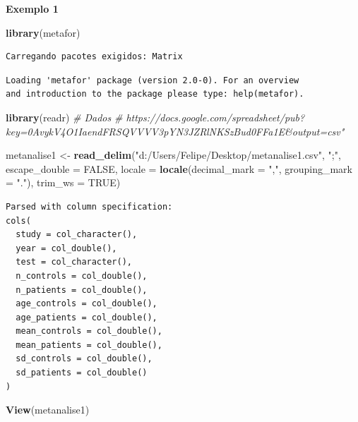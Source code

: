 \documentclass[12pt,brazil,oneside]{book}
\newenvironment{Shaded}{\begin{snugshade}}{\end{snugshade}}
\newcommand{\CommentTok}[1]{\textcolor[rgb]{0.56,0.35,0.01}{\textit{#1}}}
\newcommand{\DataTypeTok}[1]{\textcolor[rgb]{0.13,0.29,0.53}{#1}}
\newcommand{\KeywordTok}[1]{\textcolor[rgb]{0.13,0.29,0.53}{\textbf{#1}}}
\newcommand{\NormalTok}[1]{#1}
\newcommand{\OtherTok}[1]{\textcolor[rgb]{0.56,0.35,0.01}{#1}}
\newcommand{\StringTok}[1]{\textcolor[rgb]{0.31,0.60,0.02}{#1}}
\begin{document}
\textbf{Exemplo 1}

\begin{Shaded}
\begin{Highlighting}[]
\KeywordTok{library}\NormalTok{(metafor)}
\end{Highlighting}
\end{Shaded}

\begin{verbatim}
Carregando pacotes exigidos: Matrix
\end{verbatim}

\begin{verbatim}
Loading 'metafor' package (version 2.0-0). For an overview 
and introduction to the package please type: help(metafor).
\end{verbatim}

\begin{Shaded}
\begin{Highlighting}[]
\KeywordTok{library}\NormalTok{(readr)}
\CommentTok{# Dados}
\CommentTok{# https://docs.google.com/spreadsheet/pub?key=0AvykV4O1IaendFRSQVVVV3pYN3JZRlNKSzBud0FFa1E&output=csv"}

\NormalTok{metanalise1 <-}\StringTok{ }\KeywordTok{read_delim}\NormalTok{(}\StringTok{"d:/Users/Felipe/Desktop/metanalise1.csv"}\NormalTok{, }
    \StringTok{";"}\NormalTok{, }\DataTypeTok{escape_double =} \OtherTok{FALSE}\NormalTok{, }\DataTypeTok{locale =} \KeywordTok{locale}\NormalTok{(}\DataTypeTok{decimal_mark =} \StringTok{","}\NormalTok{, }
        \DataTypeTok{grouping_mark =} \StringTok{"."}\NormalTok{), }\DataTypeTok{trim_ws =} \OtherTok{TRUE}\NormalTok{)}
\end{Highlighting}
\end{Shaded}

\begin{verbatim}
Parsed with column specification:
cols(
  study = col_character(),
  year = col_double(),
  test = col_character(),
  n_controls = col_double(),
  n_patients = col_double(),
  age_controls = col_double(),
  age_patients = col_double(),
  mean_controls = col_double(),
  mean_patients = col_double(),
  sd_controls = col_double(),
  sd_patients = col_double()
)
\end{verbatim}

\begin{Shaded}
\begin{Highlighting}[]
\KeywordTok{View}\NormalTok{(metanalise1)}
\end{Highlighting}
\end{Shaded}
\end{document}
